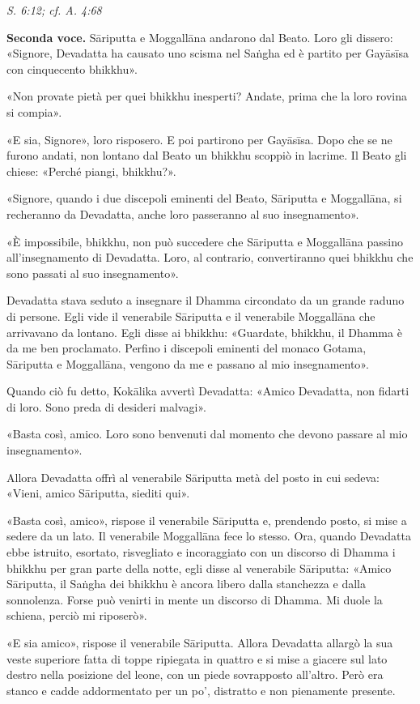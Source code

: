 \emph{S. 6:12; cf. A. 4:68}


\textbf{Seconda voce.} Sāriputta e Moggallāna andarono dal Beato. Loro gli
dissero: «Signore, Devadatta ha causato uno scisma nel Saṅgha ed è
partito per Gayāsīsa con cinquecento bhikkhu».


«Non provate pietà per quei bhikkhu inesperti? Andate, prima che la loro
rovina si compia».


«E sia, Signore», loro risposero. E poi partirono per Gayāsīsa. Dopo che
se ne furono andati, non lontano dal Beato un bhikkhu scoppiò in lacrime. Il
Beato gli chiese: «Perché piangi, bhikkhu?».


«Signore, quando i due discepoli eminenti del Beato, Sāriputta e
Moggallāna, si recheranno da Devadatta, anche loro passeranno al suo
insegnamento».


«È impossibile, bhikkhu, non può succedere che Sāriputta e Moggallāna
passino all’insegnamento di Devadatta. Loro, al contrario, convertiranno
quei bhikkhu che sono passati al suo insegnamento».


Devadatta stava seduto a insegnare il Dhamma circondato da un grande
raduno di persone. Egli vide il venerabile Sāriputta e il venerabile
Moggallāna che arrivavano da lontano. Egli disse ai bhikkhu: «Guardate,
bhikkhu, il Dhamma è da me ben proclamato. Perfino i discepoli eminenti
del monaco Gotama, Sāriputta e Moggallāna, vengono da me e passano al
mio insegnamento».


Quando ciò fu detto, Kokālika avvertì Devadatta: «Amico Devadatta, non
fidarti di loro. Sono preda di desideri malvagi».


«Basta così, amico. Loro sono benvenuti dal momento che devono passare
al mio insegnamento».


Allora Devadatta offrì al venerabile Sāriputta metà del posto in cui
sedeva: «Vieni, amico Sāriputta, siediti qui».


«Basta così, amico», rispose il venerabile Sāriputta e, prendendo posto,
si mise a sedere da un lato. Il venerabile Moggallāna fece lo stesso.
Ora, quando Devadatta ebbe istruito, esortato, risvegliato e
incoraggiato con un discorso di Dhamma i bhikkhu per gran parte della
notte, egli disse al venerabile Sāriputta: «Amico Sāriputta, il Saṅgha
dei bhikkhu è ancora libero dalla stanchezza e dalla sonnolenza. Forse
può venirti in mente un discorso di Dhamma. Mi duole la schiena, perciò
mi riposerò».


«E sia amico», rispose il venerabile Sāriputta. Allora Devadatta allargò
la sua veste superiore fatta di toppe ripiegata in quattro e si mise a
giacere sul lato destro nella posizione del leone, con un piede
sovrapposto all’altro. Però era stanco e cadde addormentato per un po’,
distratto e non pienamente presente.


